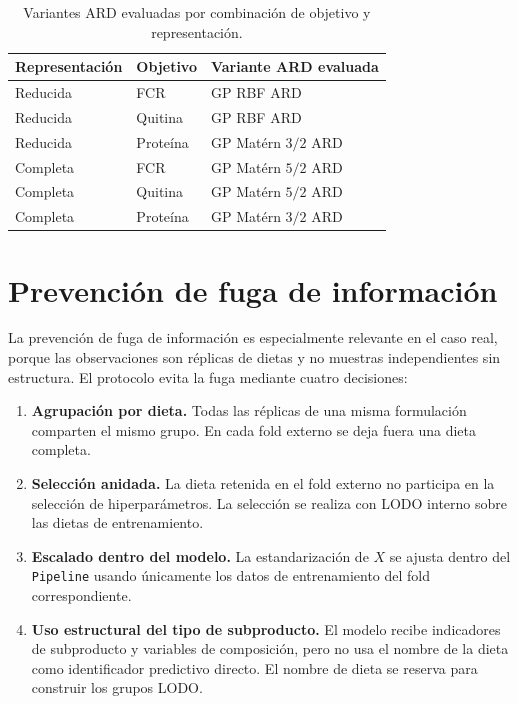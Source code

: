 \begin{table}[htbp]
\centering
\small
\caption[Variantes ARD evaluadas en el caso real]{Variantes ARD evaluadas por combinación de objetivo y representación.}
\label{tab:app_real_selected_ard}
\renewcommand{\arraystretch}{1.15}
\begin{tabular}{lll}
\toprule
\textbf{Representación} & \textbf{Objetivo} & \textbf{Variante ARD evaluada} \\
\midrule
Reducida & FCR & GP RBF ARD \\
Reducida & Quitina & GP RBF ARD \\
Reducida & Proteína & GP Matérn \(3/2\) ARD \\
Completa & FCR & GP Matérn \(5/2\) ARD \\
Completa & Quitina & GP Matérn \(5/2\) ARD \\
Completa & Proteína & GP Matérn \(3/2\) ARD \\
\bottomrule
\end{tabular}
\end{table}
\FloatBarrier

\section{Prevención de fuga de información}
\label{app:prevencion_fuga}

La prevención de fuga de información es especialmente relevante en el caso real, porque las observaciones son réplicas de dietas y no muestras independientes sin estructura. El protocolo evita la fuga mediante cuatro decisiones:

\begin{enumerate}
    \item \textbf{Agrupación por dieta.} Todas las réplicas de una misma formulación comparten el mismo grupo. En cada fold externo se deja fuera una dieta completa.
    \item \textbf{Selección anidada.} La dieta retenida en el fold externo no participa en la selección de hiperparámetros. La selección se realiza con LODO interno sobre las dietas de entrenamiento.
    \item \textbf{Escalado dentro del modelo.} La estandarización de \(X\) se ajusta dentro del \texttt{Pipeline} usando únicamente los datos de entrenamiento del fold correspondiente.
    \item \textbf{Uso estructural del tipo de subproducto.} El modelo recibe indicadores de subproducto y variables de composición, pero no usa el nombre de la dieta como identificador predictivo directo. El nombre de dieta se reserva para construir los grupos LODO.
\end{enumerate}

